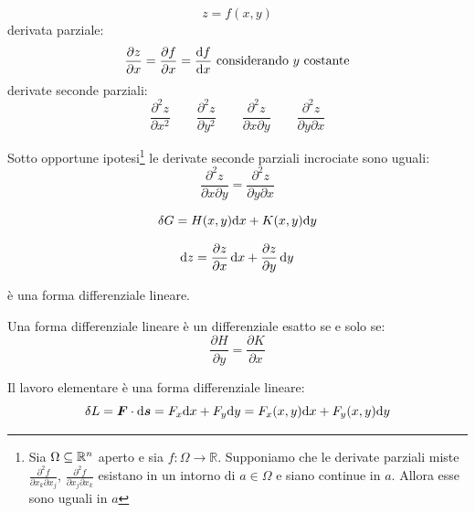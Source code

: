 \begin{equation*}z=f(x,y)\end{equation*}
derivata parziale:
\begin{equation*}\frac{\partial z}{\partial x}=\frac{\partial f}{\partial x}=\frac{\ud f}{\ud x}\ \text{considerando $y$ costante}\end{equation*}
derivate seconde parziali:
\[
\frac{\partial^2 z}{\partial x^2}\qquad \frac{\partial^2
z}{\partial y^2}\qquad \frac{\partial^2 z}{\partial x\partial
y}\qquad\frac{\partial^2 z}{\partial y\partial x}\]
\begin{Teo}[Shwartz]
Sotto opportune ipotesi\footnote{Sia $\Omega\subseteq\mathbb{R}^n$ aperto e sia $f:\Omega\to\mathbb{R}$. Supponiamo che le derivate parziali miste $\frac{\partial^2 f}{\partial x_k\partial x_j}$, $\frac{\partial^2 f}{\partial x_j\partial x_k}$ esistano in un intorno di $a\in\Omega$ e siano continue in $a$. Allora esse sono uguali in $a$} le derivate seconde parziali incrociate sono uguali:
\begin{equation*}\frac{\partial^2 z}{\partial x\partial y}=\frac{\partial^2 z}{\partial y\partial x}\end{equation*}
\end{Teo}
\begin{Def}
\begin{equation*}\delta G=H(x,y)\mathrm{d} x+K(x,y)\mathrm{d} y\end{equation*}
\end{Def}
\begin{Def}
\begin{equation*}\mathrm{d} z=\frac{\partial z}{\partial x}\,\mathrm{d} x+\frac{\partial z}{\partial y}\,\mathrm{d} y\end{equation*}
\end{Def}
è una forma differenziale lineare.
\begin{Teo}
 Una forma differenziale lineare è un differenziale esatto se e
solo se:
\begin{equation*}\frac{\partial H}{\partial y}=\frac{\partial K}{\partial x}\end{equation*}
\end{Teo}
Il lavoro elementare è una forma differenziale lineare:
\begin{equation*}\delta L=\boldsymbol{F}\cdot \mathrm{d} \boldsymbol{s}=F_x\mathrm{d} x+F_y\mathrm{d} y=F_x(x,y)\mathrm{d} x+F_y(x,y)\mathrm{d} y\end{equation*}
